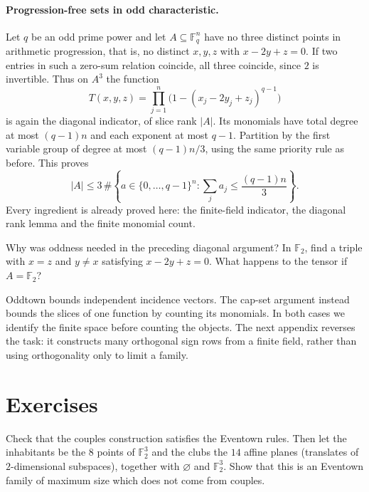 \paragraph{Progression-free sets in odd characteristic.}
Let $q$ be an odd prime power and let $A\subseteq\mathbb F_q^n$ have no three distinct
points in arithmetic progression, that is, no distinct $x,y,z$ with
$x-2y+z=0$. If two entries in such a zero-sum relation coincide, all three
coincide, since $2$ is invertible. Thus on $A^3$ the function
\[
T(x,y,z)=\prod_{j=1}^n
\bigl(1-(x_j-2y_j+z_j)^{q-1}\bigr)
\]
is again the diagonal indicator, of slice rank $|A|$. Its monomials have
total degree at most $(q-1)n$ and each exponent at most $q-1$.
Partition by the first variable group of degree at most $(q-1)n/3$, using
the same priority rule as before. This proves
\[
|A|\le3\,\#\left\{a\in\{0,\ldots,q-1\}^n:
                  \sum_j a_j\le\frac{(q-1)n}{3}\right\}.
\]
Every ingredient is already proved here: the finite-field indicator, the diagonal
rank lemma and the finite monomial count.

\begin{think}
Why was oddness needed in the preceding diagonal argument? In $\mathbb F_2$,
find a triple with $x=z$ and $y\ne x$ satisfying $x-2y+z=0$.
What happens to the tensor if $A=\mathbb F_2$?
\end{think}

\begin{beauty}
Oddtown bounds independent incidence vectors. The cap-set argument instead
bounds the slices of one function by counting its monomials. In both cases
we identify the finite space before counting the objects. The next appendix
reverses the task: it constructs many orthogonal sign rows from a finite
field, rather than using orthogonality only to limit a family.
\end{beauty}

\section{Exercises}

\begin{exercise}[$\star$]\label{combinatorial:ex:eventown}
Check that the couples construction satisfies the Eventown rules. Then let the inhabitants be the $8$ points of $\mathbb F_2^3$ and the clubs the $14$ affine planes (translates of $2$-dimensional subspaces),
together with $\varnothing$ and $\mathbb F_2^3$. Show that this is an Eventown family of maximum size which does not come from couples.
\end{exercise}

